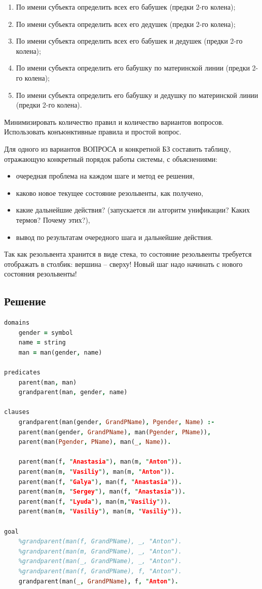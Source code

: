 \documentclass[12pt]{report}
\begin{document}
\begin{enumerate}
	\item По имени субъекта определить всех его бабушек (предки 2-го колена);
	\item По имени субъекта определить всех его дедушек (предки 2-го колена);
	\item По имени субъекта определить всех его бабушек и дедушек (предки 2-го колена);
	\item По имени субъекта определить его бабушку по материнской линии (предки 2-го колена);
	\item По имени субъекта определить его бабушку и дедушку по материнской линии (предки 2-го колена).
\end{enumerate}

Минимизировать количество правил и количество вариантов вопросов. Использовать конъюнктивные правила и простой вопрос.

Для одного из вариантов ВОПРОСА и конкретной БЗ составить таблицу, отражающую конкретный порядок работы системы, с объяснениями:

\begin{itemize}
	\item очередная проблема на каждом шаге и метод ее решения,
	\item каково новое текущее состояние резольвенты, как получено,
	\item какие дальнейшие действия? (запускается ли алгоритм унификации? Каких термов? Почему этих?),
	\item вывод по результатам очередного шага и дальнейшие действия.
\end{itemize}

Так как резольвента хранится в виде стека, то состояние резольвенты требуется отображать в столбик: вершина – сверху! Новый шаг надо начинать с нового состояния резольвенты!

\subsection*{Решение}
\begin{lstlisting}[language=prolog]
domains
	gender = symbol
	name = string
	man = man(gender, name)

predicates
	parent(man, man)
	grandparent(man, gender, name)
	
clauses
	grandparent(man(gender, GrandPName), Pgender, Name) :-
	parent(man(gender, GrandPName), man(Pgender, PName)),
	parent(man(Pgender, PName), man(_, Name)).
	
	parent(man(f, "Anastasia"), man(m, "Anton")).
	parent(man(m, "Vasiliy"), man(m, "Anton")).
	parent(man(f, "Galya"), man(f, "Anastasia")).
	parent(man(m, "Sergey"), man(f, "Anastasia")).
	parent(man(f, "Lyuda"), man(m,"Vasiliy")).
	parent(man(m, "Vasiliy"), man(m, "Vasiliy")).

goal
	%grandparent(man(f, GrandPName), _, "Anton").
	%grandparent(man(m, GrandPName), _, "Anton").
	%grandparent(man(_, GrandPName), _, "Anton").
	%grandparent(man(f, GrandPName), f, "Anton").
	grandparent(man(_, GrandPName), f, "Anton").
\end{lstlisting}



	
\end{document}
